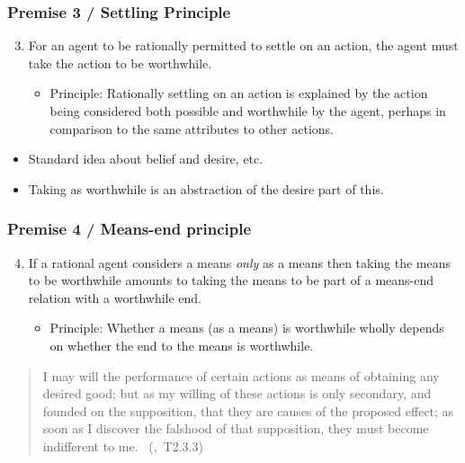 \documentclass[noamssymb,
]{beamer} %
\newcommand{\hozlinedash}[0]{%
  \noindent\hdashrule[0.5ex][c]{\textwidth}{.1pt}{2.5pt}
}
\begin{document}
\begin{frame}
  \frametitle{Premise 3 / Settling Principle}

  \begin{enumerate}
    \setcounter{enumi}{2}
  \item For an agent to be rationally permitted to settle on an action, the agent must take the action to be worthwhile.
    \begin{itemize}
    \item Principle: Rationally settling on an action is explained by the action being considered both possible and worthwhile by the agent, perhaps in comparison to the same attributes to other actions.
    \end{itemize}
  \end{enumerate}

  \begin{itemize}
  \item Standard idea about belief and desire, etc.
  \item Taking as worthwhile is an abstraction of the desire part of this.
  \end{itemize}
\end{frame}

\begin{frame}
  \frametitle{Premise 4 / Means-end principle}

  \begin{enumerate}
    \setcounter{enumi}{3}
  \item If a rational agent considers a means \emph{only} as a means then taking the means to be worthwhile amounts to taking the means to be part of a means-end relation with a worthwhile end.
    \begin{itemize}
    \item Principle: Whether a means (as a means) is worthwhile wholly depends on whether the end to the means is worthwhile.
    \end{itemize}
  \end{enumerate}

\end{frame}



\begin{frame}



\begin{quote}
  I may will the performance of certain actions as means of obtaining any desired good; but as my willing of these actions is only secondary, and founded on the supposition, that they are causes of the proposed effect; as soon as I discover the falshood of that supposition, they must become indifferent to me.\nolinebreak
  \mbox{ }\hfill\mbox{\hfill(\citeauthor{Hume:2011aa}, T2.3.3)}
\end{quote}

\end{frame}
\end{document}
